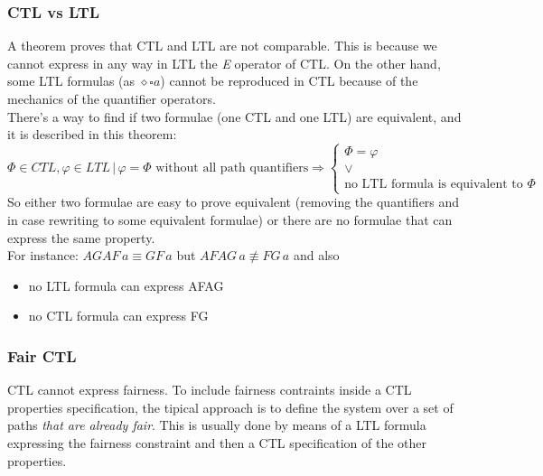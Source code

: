 \documentclass{article}
\begin{document}
				\subsubsection{CTL vs LTL}
					A theorem proves that CTL and LTL are not comparable. This is because we cannot express in any way in LTL the \emph{E} operator of CTL. On the other hand, some LTL formulas (as $\diamond \square a$) cannot be reproduced in CTL because of the mechanics of the quantifier operators.\\
					There's a way to find if two formulae (one CTL and one LTL) are equivalent, and it is described in this theorem:
					\begin{equation}
						\Phi \in CTL, \varphi \in LTL \,\vert\, \varphi = \Phi \text{ without all path quantifiers} \Rightarrow
						\begin{cases}
							\Phi = \varphi\\
							\vee\\
							\text{no LTL formula is equivalent to } \Phi
						\end{cases}
					\end{equation}
					So either two formulae are easy to prove equivalent (removing the quantifiers and in case rewriting to some equivalent formulae) or there are no formulae that can express the same property.\\
					For instance: $AGAF \, a \equiv GF \, a$ but $AFAG \, a \nequiv FG \, a$ and also 
					\begin{itemize}
						\item no LTL formula can express AFAG
						\item no CTL formula can express FG
					\end{itemize}
					
				\subsubsection{Fair CTL}
					CTL cannot express fairness. To include fairness contraints inside a CTL properties specification, the tipical approach is to define the system over a set of paths \emph{that are already fair}. This is usually done by means of a LTL formula expressing the fairness constraint and then a CTL specification of the other properties.
					
\end{document}
